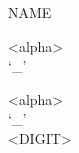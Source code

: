 \documentclass[convert={outext=.png}]{standalone}
\begin{document}
\begin{málrit}{NAME}
	\begin{stack}
		<alpha>\\
		`_'
	\end{stack}
	\begin{repnull}
		\begin{stack}
			<alpha>\\
			`_'\\
			<DIGIT>
		\end{stack}
	\end{repnull}
\end{málrit}
\end{document}
